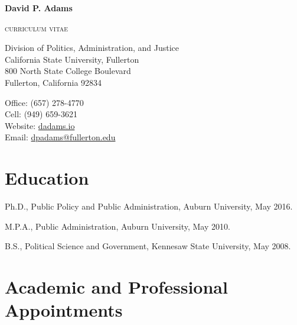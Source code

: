 \documentclass[11pt,letterpaper]{article}
\def\name{David P. Adams}
\renewenvironment{itemize}{
  \begin{list}{}{
    \setlength{\leftmargin}{1.5em}
    \setlength{\itemsep}{0.25em}
    \setlength{\parskip}{0pt}
    \setlength{\parsep}{0.25em}
  }
}{
  \end{list}
}
\begin{document}
    
    
\centerline{\huge \bf \name}
\smallskip
\centerline{\small{\textsc{curriculum vitae}}}

\bigskip

\noindent

\begin{minipage}[t]{0.55\textwidth}
    Division of Politics, Administration, and Justice \\
    California State University, Fullerton \\
    800 North State College Boulevard  \\
    Fullerton, California 92834
\end{minipage}
\hfill
\begin{minipage}[t]{0.4\textwidth}
    Office: \hspace{6em}(657) 278-4770 \\
    Cell: \hspace{6.5em} (949) 659-3621 \\
    Website: \hspace{6.5em}\href{https://dadams.io}{dadams.io} \\
    Email: \hspace{1.2em}\href{mailto:dpadams@fullerton.edu}{dpadams@fullerton.edu}
\end{minipage}


  \section*{Education}

  \begin{itemize}\leftmargin=2pt\itemindent=-15pt
  \item Ph.D., Public Policy and Public Administration, Auburn University, May 2016. \vspace{0.2cm}
  \item M.P.A., Public Administration, Auburn University, May 2010. \vspace{0.2cm}
  \item B.S., Political Science and Government, Kennesaw State University, May 2008.
  \end{itemize}
  
  \section*{Academic and Professional Appointments}
\end{document}
